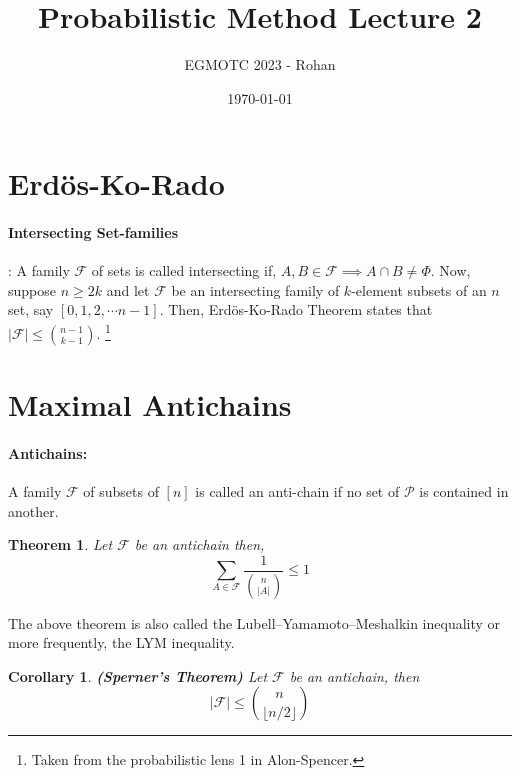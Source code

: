 \documentclass[12pt]{article}
\title{Probabilistic Method Lecture 2}
\author{EGMOTC 2023 - Rohan}
\date{\today}
\begin{document}
\maketitle

\newcommand{\localtextbulletone}{\textcolor{black}{\raisebox{.45ex}{\rule{.6ex}{.6ex}}}}
\renewcommand{\labelitemi}{\localtextbulletone}

\newtheorem{definition}{Definition}
\newtheorem{theorem}{Theorem}
\newtheorem{corollary}{Corollary}

\thispagestyle{empty}

\section*{Erd\"{o}s-Ko-Rado}

\paragraph{\textbf{Intersecting Set-families}}: A family $\mathcal{F}$ of sets is called intersecting if, $A,B\in \mathcal{F}\implies A\cap B\ne \Phi$. Now, suppose $n\ge 2k$ and let $\mathcal{F}$ be an intersecting family of $k$-element subsets of an $n$ set, say $[0,1,2,\cdots n-1]$. Then, Erd\"{o}s-Ko-Rado Theorem states that $|\mathcal{F}|\le \binom{n-1}{k-1}$. \footnote{Taken from the probabilistic lens 1 in Alon-Spencer.}

\section*{Maximal Antichains}

\paragraph*{Antichains:} A family $\mathcal{F}$ of subsets of $[n]$ is called an anti-chain if no set of $\mathcal{P}$ is contained in another. 

\begin{theorem}
    Let $\mathcal{F}$ be an antichain then, \[\sum_{A\in \mathcal{F}}\frac{1}{\binom{n}{|A|}}\le 1\]
\end{theorem}

The above theorem is also called the Lubell–Yamamoto–Meshalkin inequality or more frequently, the LYM inequality.

\begin{corollary} \textbf{(Sperner's Theorem)} Let $\mathcal{F}$ be an antichain, then 
    \[|\mathcal{F}|\le \binom{n}{\lfloor n/2 \rfloor}\]
\end{corollary}
\end{document}

